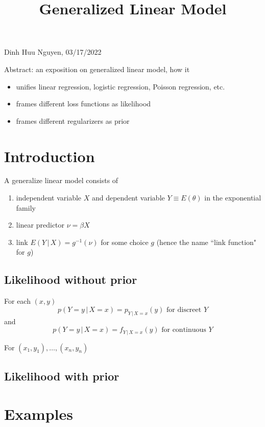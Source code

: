 \documentclass[12pt]{amsart}
\title{Generalized Linear Model}
\theoremstyle{definition}
\begin{document}
\maketitle

\begin{center}
Dinh Huu Nguyen, 03/17/2022
\end{center}
\vspace{20pt}

Abstract: an exposition on generalized linear model, how it
\begin{itemize}
\item unifies linear regression, logistic regression, Poisson regression, etc.
\item frames different loss functions as likelihood
\item frames different regularizers as prior
\end{itemize}
\vspace{20pt}

\tableofcontents

\section{Introduction} A generalize linear model consists of
\begin{enumerate}
\item independent variable $X$ and dependent variable $Y \equiv E(\theta)$ in the exponential family
\item linear predictor $\nu = \beta X$
\item link $E(Y \,|\, X) = g^{-1}(\nu)$ for some choice $g$ (hence the name ``link function" for $g$)
\end{enumerate}

\subsection{Likelihood without prior}
For each $(x, y)$
$$p(Y = y \,|\, X = x) = p_{Y \,|\, X = x}(y) \text{ for discreet } Y$$
and
$$p(Y = y \,|\, X = x) = f_{Y \,|\, X = x}(y) \text{ for continuous } Y$$

For $(x_1, y_1), \dots , (x_n, y_n)$

\subsection{Likelihood with prior}

\section{Examples}
\end{document}
